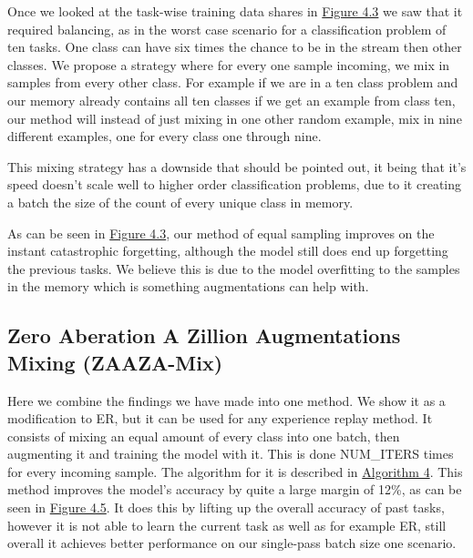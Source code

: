 \documentclass[oneside]{ctuthesis}
\begin{document}
Once we looked at the task-wise training data shares in \hyperref[fig:er-equal-sampling]{Figure 4.3} we saw that it required balancing, as in the worst case scenario for a classification problem of ten tasks. One class can have six times the chance to be in the stream then other classes. We propose a strategy where for every one sample incoming, we mix in samples from every other class. For example if we are in a ten class problem and our memory already contains all ten classes if we get an example from class ten, our method will instead of just mixing in one other random example, mix in nine different examples, one for every class one through nine.

This mixing strategy has a downside that should be pointed out, it being that it's speed doesn't scale well to higher order classification problems, due to it creating a batch the size of the count of every unique class in memory.

As can be seen in \hyperref[fig:er-equal-sampling]{Figure 4.3}, our method of equal sampling improves on the instant catastrophic forgetting, although the model still does end up forgetting the previous tasks. We believe this is due to the model overfitting to the samples in the memory which is something augmentations can help with.

\subsection{Zero Aberation A Zillion Augmentations Mixing (ZAAZA-Mix)}
Here we combine the findings we have made into one method. We show it as a modification to ER, but it can be used for any experience replay method. It consists of mixing an equal amount of every class into one batch, then augmenting it and training the model with it. This is done NUM\_ITERS times for every incoming sample. The algorithm for it is described in \hyperref[alg:ZAAZA-Mix]{Algorithm 4}. This method improves the model's accuracy by quite a large margin of 12\%, as can be seen in \hyperref[fig:er-zaaza]{Figure 4.5}. It does this by lifting up the overall accuracy of past tasks, however it is not able to learn the current task as well as for example ER, still overall it achieves better performance on our single-pass batch size one scenario.
\end{document}
